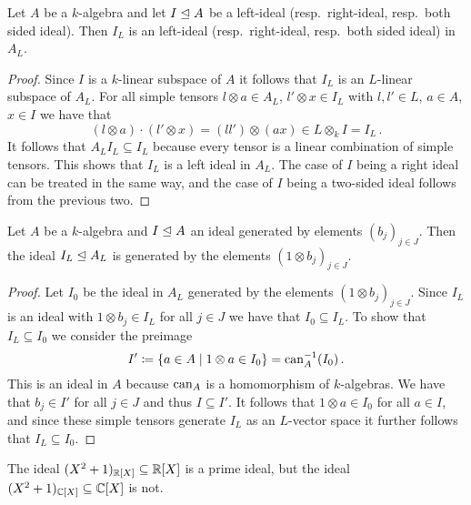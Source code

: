 \begin{lemma}
  Let $A$ be a $k$-algebra and let $I \trianglelefteq A$ be a left-ideal (resp.\ right-ideal, resp.\ both sided ideal).
  Then $I_L$ is an left-ideal (resp.\ right-ideal, resp.\ both sided ideal) in $A_L$.
\end{lemma}
\begin{proof}
  Since $I$ is a $k$-linear subspace of $A$ it follows that $I_L$ is an $L$-linear subspace of $A_L$.
  For all simple tensors $l \otimes a \in A_L$, $l' \otimes x \in I_L$ with $l, l' \in L$, $a \in A$, $x \in I$ we have that
  \[
        (l \otimes a) \cdot (l' \otimes x)
    =   (l l') \otimes (a x)
    \in L \otimes_k I
    =   I_L \,.
  \]
  It follows that $A_L I_L \subseteq I_L$ because every tensor is a linear combination of simple tensors.
  This shows that $I_L$ is a left ideal in $A_L$.
  The case of $I$ being a right ideal can be treated in the same way, and the case of $I$ being a two-sided ideal follows from the previous two.
\end{proof}


\begin{lemma}
  Let $A$ be a $k$-algebra and $I \trianglelefteq A$ an ideal generated by elements $(b_j)_{j \in J}$.
  Then the ideal $I_L \trianglelefteq A_L$ is generated by the elements $(1 \otimes b_j)_{j \in J}$.
\end{lemma}
\begin{proof}
  Let $I_0$ be the ideal in $A_L$ generated by the elements $(1 \otimes b_j)_{j \in J}$.
  Since $I_L$ is an ideal with $1 \otimes b_j \in I_L$ for all $j \in J$ we have that $I_0 \subseteq I_L$.
  To show that $I_L \subseteq I_0$ we consider the preimage
  \[
              I'
    \coloneqq \{
                a \in A
              \mid
                1 \otimes a \in I_0
              \}
    =         \operatorname{can}_A^{-1}(I_0) \,.
  \]
  This is an ideal in $A$ because $\operatorname{can}_A$ is a homomorphism of $k$-algebras.
  We have that $b_j \in I'$ for all $j \in J$ and thus $I \subseteq I'$.
  It follows that $1 \otimes a \in I_0$ for all $a \in I$, and since these simple tensors generate $I_L$ as an $L$-vector space it further follows that $I_L \subseteq I_0$.
\end{proof}


\begin{warning}
  The ideal $(X^2+1)_{\mathbb{R}[X]} \subseteq \mathbb{R}[X]$ is a prime ideal, but the ideal \mbox{$(X^2+1)_{\mathbb{C}[X]} \subseteq \mathbb{C}[X]$} is not.
\end{warning}




